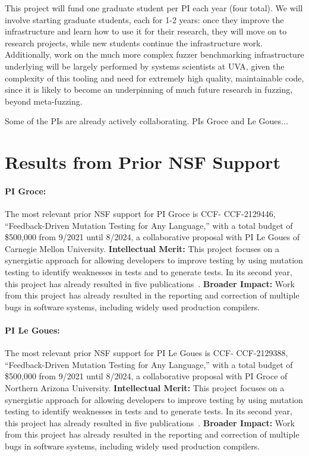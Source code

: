 This project will fund one graduate student per PI each year
(four total).  We will
involve starting graduate students, each for 1-2 years: once they
improve the infrastructure and learn how to use it for their research,
they will move on to research projects, while new
students continue the infrastructure work.  Additionally, work on the much more 
complex fuzzer benchmarking infrastructure underlying will be largely performed 
by systems scientists at UVA, given the complexity of this tooling and need for 
extremely high quality, maintainable code, since it is likely to become an 
underpinning of much future research in fuzzing, beyond meta-fuzzing.


Some of the PIs are already actively collaborating.
PIs Groce and Le Goues...



\section{Results from Prior NSF Support}

\paragraph{PI Groce:}
The most relevant prior NSF support for PI Groce is CCF-
CCF-2129446, ``Feedback-Driven Mutation Testing for Any Language,'' with a 
total budget of \$500,000 from 9/2021 until 8/2024,
a collaborative proposal with PI Le Goues of Carnegie Mellon
University. {\bf Intellectual Merit:} This project
focuses on a synergistic approach for allowing developers
to improve testing by using mutation testing to identify
weaknesses in tests and to generate tests.  In its second
year,  this project has already resulted in five
publications~\cite{cc2022,seip2022,fuzzing22}. {\bf
  Broader
  Impact:}  Work from this project has already
resulted in the reporting and correction of multiple bugs in software
systems, including widely used production compilers.

\paragraph{PI Le Goues:}
The most relevant prior NSF support for PI Le Goues is CCF-
CCF-2129388, ``Feedback-Driven Mutation Testing for Any Language,'' with a 
total budget of \$500,000 from 9/2021 until 8/2024,
a collaborative proposal with PI Groce of Northern Arizona University. {\bf Intellectual Merit:} This project
focuses on a synergistic approach for allowing developers
to improve testing by using mutation testing to identify
weaknesses in tests and to generate tests.  In its second
year,  this project has already resulted in five
publications~\cite{cc2022,seip2022,fuzzing22}. {\bf
  Broader
  Impact:}  Work from this project has already
resulted in the reporting and correction of multiple bugs in software
systems, including widely used production compilers.


